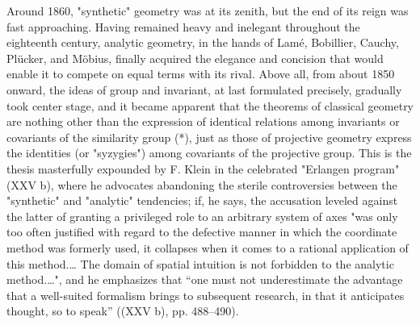 Around 1860, "synthetic" geometry was at its zenith, but the end of its reign was fast approaching. Having remained heavy and inelegant throughout the eighteenth century, analytic geometry, in the hands of Lamé, Bobillier, Cauchy, Plücker, and Möbius, finally acquired the elegance and concision that would enable it to compete on equal terms with its rival. Above all, from about 1850 onward, the ideas of group and invariant, at last formulated precisely, gradually took center stage, and it became apparent that the theorems of classical geometry are nothing other than the expression of identical relations among invariants or covariants of the similarity group (*), just as those of projective geometry express the identities (or "syzygies") among covariants of the projective group. This is the thesis masterfully expounded by F. Klein in the celebrated "Erlangen program" (XXV b), where he advocates abandoning the sterile controversies between the "synthetic" and "analytic" tendencies; if, he says, the accusation leveled against the latter of granting a privileged role to an arbitrary system of axes "was only too often justified with regard to the defective manner in which the coordinate method was formerly used, it collapses when it comes to a rational application of this method.\ldots{} The domain of spatial intuition is not forbidden to the analytic method.\ldots{}", and he emphasizes that “one must not underestimate the advantage that a well-suited formalism brings to subsequent research, in that it anticipates thought, so to speak” ((XXV b), pp. 488–490).

